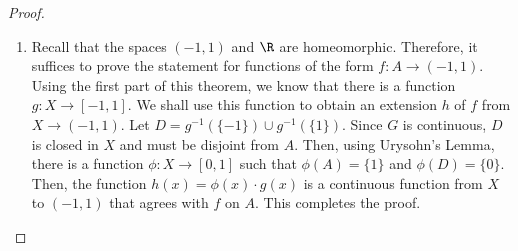 \begin{proof}
\begin{enumerate}
        Hence, we may take the restriction of $s_n$ to $[-1,1]$, which would also be continuous since it is the range restriction of a sum of finitely many continuous functions. Now, due to the Weierstrass $M$-test, the sequence of functions $s_n$ are uniformly convergent. Further, since 
        \begin{equation*}
            |f(a) - s_n(a)|\le\left(\frac{2}{3}\right)^n
        \end{equation*}
        we know that the convergent function $s:X\to[-1,1]$ agrees with $f$ on $A$. This completes the proof. 

        \item Recall that the spaces $(-1,1)$ and $\R$ are homeomorphic. Therefore, it suffices to prove the statement for functions of the form $f:A\to(-1,1)$. Using the first part of this theorem, we know that there is a function $g:X\to[-1,1]$. We shall use this function to obtain an extension $h$ of $f$ from $X\to(-1,1)$. Let $D = g^{-1}(\{-1\})\cup g^{-1}(\{1\})$. Since $G$ is continuous, $D$ is closed in $X$ and must be disjoint from $A$. Then, using Urysohn's Lemma, there is a function $\phi:X\to[0,1]$ such that $\phi(A) = \{1\}$ and $\phi(D) = \{0\}$. Then, the function $h(x) = \phi(x)\cdot g(x)$ is a continuous function from $X$ to $(-1,1)$ that agrees with $f$ on $A$. This completes the proof.
    \end{enumerate}
\end{proof}